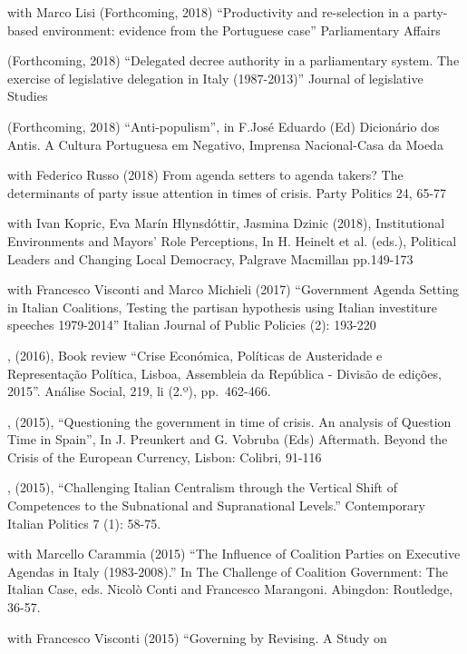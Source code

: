 \documentclass[11pt,]{article}
\renewenvironment{itemize}{
  \begin{list}{}{
    \setlength{\leftmargin}{1.5em}
  }
}{
  \end{list}
}
\begin{document}
\begin{itemize}
\item
  with Marco Lisi (Forthcoming, 2018) ``Productivity and re-selection in
  a party-based environment: evidence from the Portuguese case''
  Parliamentary Affairs
\item
  (Forthcoming, 2018) ``Delegated decree authority in a parliamentary
  system. The exercise of legislative delegation in Italy (1987-2013)''
  Journal of legislative Studies
\item
  (Forthcoming, 2018) ``Anti-populism'', in F.José Eduardo (Ed)
  Dicionário dos Antis. A Cultura Portuguesa em Negativo, Imprensa
  Nacional-Casa da Moeda
\item
  with Federico Russo (2018) From agenda setters to agenda takers? The
  determinants of party issue attention in times of crisis. Party
  Politics 24, 65-77
\item
  with Ivan Kopric, Eva Marín Hlynsdóttir, Jasmina Dzinic (2018),
  Institutional Environments and Mayors' Role Perceptions, In H. Heinelt
  et al. (eds.), Political Leaders and Changing Local Democracy,
  Palgrave Macmillan pp.149-173
\item
  with Francesco Visconti and Marco Michieli (2017) ``Government Agenda
  Setting in Italian Coalitions, Testing the partisan hypothesis using
  Italian investiture speeches 1979-2014'' Italian Journal of Public
  Policies (2): 193-220
\item
  , (2016), Book review ``Crise Económica, Políticas de Austeridade e
  Representação Política, Lisboa, Assembleia da República - Divisão de
  edições, 2015''. Análise Social, 219, li (2.º), pp.~462-466.
\item
  , (2015), ``Questioning the government in time of crisis. An analysis
  of Question Time in Spain'', In J. Preunkert and G. Vobruba (Eds)
  Aftermath. Beyond the Crisis of the European Currency, Lisbon:
  Colibri, 91-116
\item
  , (2015), ``Challenging Italian Centralism through the Vertical Shift
  of Competences to the Subnational and Supranational Levels.''
  Contemporary Italian Politics 7 (1): 58-75.
\item
  with Marcello Carammia (2015) ``The Influence of Coalition Parties on
  Executive Agendas in Italy (1983-2008).'' In The Challenge of
  Coalition Government: The Italian Case, eds. Nicolò Conti and
  Francesco Marangoni. Abingdon: Routledge, 36-57.
\item
  with Francesco Visconti (2015) ``Governing by Revising. A Study on

\end{itemize}
\end{document}
